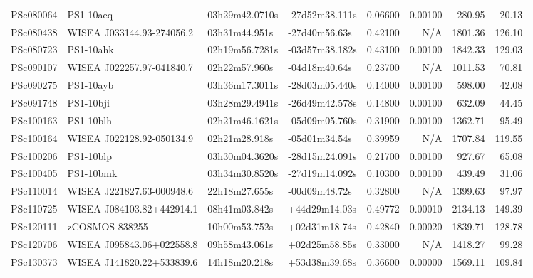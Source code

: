 \begin{longtable}{llllrrrr}
PSc080064        &                       PS1-10aeq &  03h29m42.0710s &  -27d52m38.111s &  0.06600 &  0.00100 &   280.95 &       20.13 \\
PSc080438        &       WISEA J033144.93-274056.2 &   03h31m44.951s &   -27d40m56.63s &  0.42100 &      N/A &  1801.36 &      126.10 \\
PSc080723        &                       PS1-10ahk &  02h19m56.7281s &  -03d57m38.182s &  0.43100 &  0.00100 &  1842.33 &      129.03 \\
PSc090107        &       WISEA J022257.97-041840.7 &   02h22m57.960s &   -04d18m40.64s &  0.23700 &      N/A &  1011.53 &       70.81 \\
PSc090275        &                       PS1-10ayb &  03h36m17.3011s &  -28d03m05.440s &  0.14000 &  0.00100 &   598.00 &       42.08 \\
PSc091748        &                       PS1-10bji &  03h28m29.4941s &  -26d49m42.578s &  0.14800 &  0.00100 &   632.09 &       44.45 \\
PSc100163        &                       PS1-10blh &  02h21m46.1621s &  -05d09m05.760s &  0.31900 &  0.00100 &  1362.71 &       95.49 \\
PSc100164        &       WISEA J022128.92-050134.9 &   02h21m28.918s &   -05d01m34.54s &  0.39959 &      N/A &  1707.84 &      119.55 \\
PSc100206        &                       PS1-10blp &  03h30m04.3620s &  -28d15m24.091s &  0.21700 &  0.00100 &   927.67 &       65.08 \\
PSc100405        &                       PS1-10bmk &  03h34m30.8520s &  -27d19m14.092s &  0.10300 &  0.00100 &   439.49 &       31.06 \\
PSc110014        &       WISEA J221827.63-000948.6 &   22h18m27.655s &   -00d09m48.72s &  0.32800 &      N/A &  1399.63 &       97.97 \\
PSc110725        &       WISEA J084103.82+442914.1 &   08h41m03.842s &   +44d29m14.03s &  0.49772 &  0.00010 &  2134.13 &      149.39 \\
PSc120111        &                  zCOSMOS 838255 &   10h00m53.752s &   +02d31m18.74s &  0.42840 &  0.00020 &  1839.71 &      128.78 \\
PSc120706        &       WISEA J095843.06+022558.8 &   09h58m43.061s &   +02d25m58.85s &  0.33000 &      N/A &  1418.27 &       99.28 \\
PSc130373        &       WISEA J141820.22+533839.6 &   14h18m20.218s &   +53d38m39.68s &  0.36600 &  0.00000 &  1569.11 &      109.84 \\

\end{longtable}
